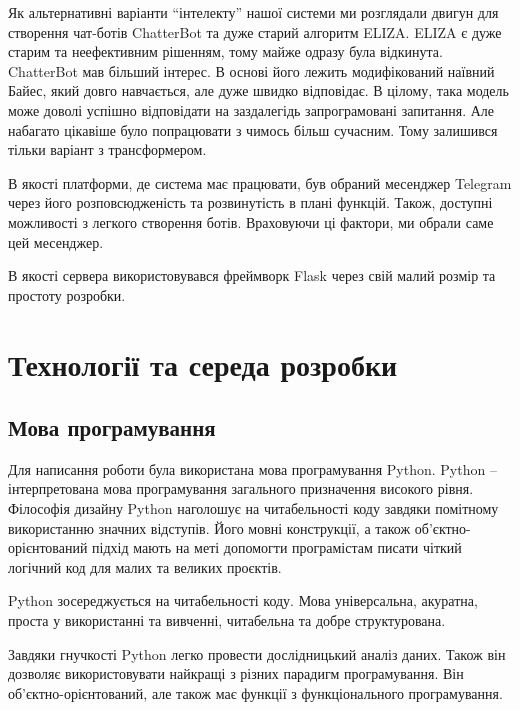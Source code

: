 \documentclass[a4paper,14pt]{extreport}
\begin{document}
    Як альтернативні варіанти ``інтелекту'' нашої системи ми розглядали двигун для створення чат-ботів ChatterBot та дуже старий алгоритм ELIZA. ELIZA є дуже старим та неефективним рішенням, тому майже одразу була відкинута. ChatterBot мав більший інтерес. В основі його лежить модифікований наївний Байес, який довго навчається, але дуже швидко відповідає. В цілому, така модель може доволі успішно відповідати на заздалегідь запрограмовані запитання. Але набагато цікавіше було попрацювати з чимось більш сучасним. Тому залишився тільки варіант з трансформером.

    В якості платформи, де система має працювати, був обраний месенджер Telegram через його розповсюдженість та розвинутість в плані функцій. Також, доступні можливості з легкого створення ботів. Враховуючи ці фактори, ми обрали саме цей месенджер.

    В якості сервера використовувався фреймворк Flask через свій малий розмір та простоту розробки.

\section{Технології та середа розробки}
    \subsection{Мова програмування}
        Для написання роботи була використана мова програмування Python. Python -- інтерпретована мова програмування загального призначення високого рівня. Філософія дизайну Python наголошує на читабельності коду завдяки помітному використанню значних відступів. Його мовні конструкції, а також об’єктно-орієнтований підхід мають на меті допомогти програмістам писати чіткий логічний код для малих та великих проєктів.

        Python зосереджується на читабельності коду. Мова універсальна, акуратна, проста у використанні та вивченні, читабельна та добре структурована.

        Завдяки гнучкості Python легко провести дослідницький аналіз даних. Також він дозволяє використовувати найкращі з різних парадигм програмування. Він об’єктно-орієнтований, але також має функції з функціонального програмування.
\end{document}
